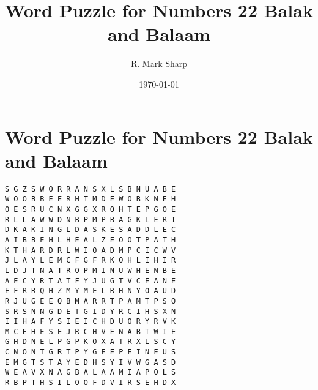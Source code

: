 \documentclass[12pt,a4paper,article]{memoir}\usepackage[]{graphicx}\usepackage[]{color}
\title{Word Puzzle for Numbers 22 Balak and Balaam}
\subtitle{}
\author{R. Mark Sharp}
\date{\today}
\begin{document}
\maketitle






\clearpage
\Large
\section*{Word Puzzle for Numbers 22 Balak and Balaam}
\begin{verbatim}
S G Z S W O R R A N S X L S B N U A B E 
W O O B B E E R H T M D E W O B K N E H 
O E S R U C N X G G X R O H T E P G O E 
R L L A W W D N B P M P B A G K L E R I 
D K A K I N G L D A S K E S A D D L E C 
A I B B E H L H E A L Z E O O T P A T H 
K T H A R D R L W I O A D M P C I C W V 
J L A Y L E M C F G F R K O H L I H I R 
L D J T N A T R O P M I N U W H E N B E 
A E C Y R T A T F Y J U G T V C E A N E 
E F R R Q H Z M Y M E L R H N Y O A U D 
R J U G E E Q B M A R R T P A M T P S O 
S R S N N G D E T G I D Y R C I H S X N 
I I H A F Y S I E I C H D U O R Y R V K 
M C E H E S E J R C H V E N A B T W I E 
G H D N E L P G P K O X A T R X L S C Y 
C N O N T G R T P Y G E E P E I N E U S 
E M G T S T A Y E D H S Y I V W G A S D 
W E A V X N A G B A L A A M I A P O L S 
R B P T H S I L O O F D V I R S E H D X 

\end{verbatim}
\clearpage
\normalsize
\end{document}
